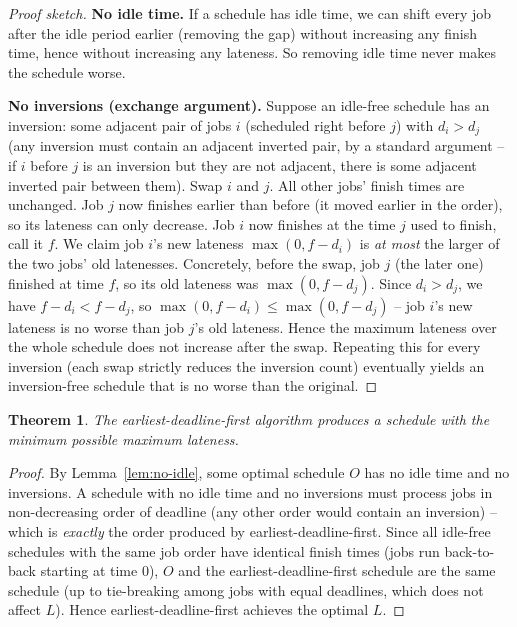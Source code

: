 \documentclass[11pt]{article}
\newtheorem{theorem}{Theorem}[section]
\begin{document}
\begin{proof}[Proof sketch]
\textbf{No idle time.} If a schedule has idle time, we can shift every job after the idle
period earlier (removing the gap) without increasing any finish time, hence without
increasing any lateness. So removing idle time never makes the schedule worse.

\textbf{No inversions (exchange argument).} Suppose an idle-free schedule has an
inversion: some adjacent pair of jobs $i$ (scheduled right before $j$) with $d_i > d_j$
(any inversion must contain an adjacent inverted pair, by a standard argument -- if $i$
before $j$ is an inversion but they are not adjacent, there is some adjacent inverted pair
between them). Swap $i$ and $j$. All other jobs' finish times are unchanged. Job $j$ now
finishes earlier than before (it moved earlier in the order), so its lateness can only
decrease. Job $i$ now finishes at the time $j$ used to finish, call it $f$. We claim job
$i$'s new lateness $\max(0, f - d_i)$ is \emph{at most} the larger of the two jobs' old
latenesses. Concretely, before the swap, job $j$ (the later one) finished at time $f$, so
its old lateness was $\max(0, f - d_j)$. Since $d_i > d_j$, we have $f - d_i < f - d_j$, so
$\max(0,f-d_i) \le \max(0, f-d_j)$ -- job $i$'s new lateness is no worse than job $j$'s old
lateness. Hence the maximum lateness over the whole schedule does not increase after the
swap. Repeating this for every inversion (each swap strictly reduces the inversion count)
eventually yields an inversion-free schedule that is no worse than the original.
\end{proof}

\begin{theorem}
The earliest-deadline-first algorithm produces a schedule with the minimum possible
maximum lateness.
\end{theorem}

\begin{proof}
By Lemma~\ref{lem:no-idle}, some optimal schedule $O$ has no idle time and no inversions.
A schedule with no idle time and no inversions must process jobs in non-decreasing order
of deadline (any other order would contain an inversion) -- which is \emph{exactly} the
order produced by earliest-deadline-first. Since all idle-free schedules with the same job
order have identical finish times (jobs run back-to-back starting at time 0), $O$ and the
earliest-deadline-first schedule are the same schedule (up to tie-breaking among jobs with
equal deadlines, which does not affect $L$). Hence earliest-deadline-first achieves the
optimal $L$.
\end{proof}
\end{document}
